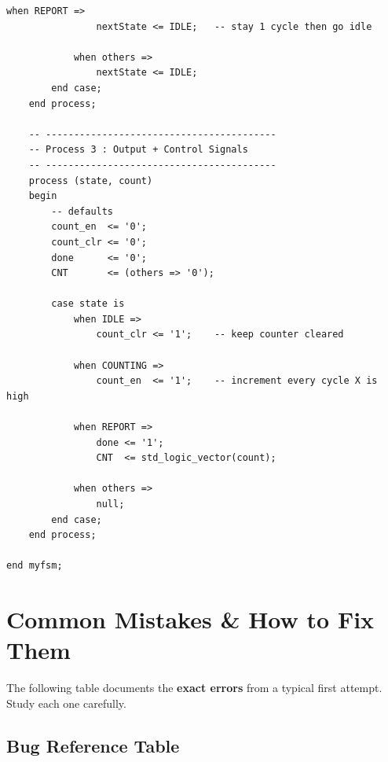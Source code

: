 \documentclass[12pt,a4paper]{article}
\begin{document}
\begin{tcolorbox}[vhdlbox, title={Level 6 --- pulse\_counter\_fsmd.vhd}]
\begin{lstlisting}[style=vhdlstyle]
            when REPORT =>
                nextState <= IDLE;   -- stay 1 cycle then go idle

            when others =>
                nextState <= IDLE;
        end case;
    end process;

    -- -----------------------------------------
    -- Process 3 : Output + Control Signals
    -- -----------------------------------------
    process (state, count)
    begin
        -- defaults
        count_en  <= '0';
        count_clr <= '0';
        done      <= '0';
        CNT       <= (others => '0');

        case state is
            when IDLE =>
                count_clr <= '1';    -- keep counter cleared

            when COUNTING =>
                count_en  <= '1';    -- increment every cycle X is high

            when REPORT =>
                done <= '1';
                CNT  <= std_logic_vector(count);

            when others =>
                null;
        end case;
    end process;

end myfsm;
\end{lstlisting}
\end{tcolorbox}

\newpage

\section{Common Mistakes \& How to Fix Them}

\begin{tcolorbox}[notebox, title={These bugs were found in a real student file!}]
  The following table documents the \textbf{exact errors} from a typical
  first attempt. Study each one carefully.
\end{tcolorbox}

\subsection{Bug Reference Table}
\end{document}
